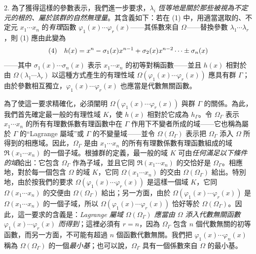 \documentclass[11pt]{article}
\providecommand{\glqq}{“}
\providecommand{\grqq}{”}
\begin{document}
2. 為了獲得這樣的參數表示，我們進一步要求，$\lambda_i$ \emph{恆等地是關於那些被視為不定元的根的、屬於該群的自然無理量}。其含義如下：若在 (1) 中，用適當選取的、不定元 $x_1\cdots x_n$ 的\emph{有理}函數 $\varphi_1(x)\cdots\varphi_r(x)$——其係數來自 $\Omega$——替換參數 $\lambda_1\cdots\lambda_r$，則 (1) 應由此變為
\[
\begin{array}{@{}l@{\quad}l@{}}
(4)& \displaystyle h(x)=x^n-\sigma_1(x)x^{n-1}+\sigma_2(x)x^{n-2}\cdots\pm\sigma_n(x)
\end{array}
\]
——其中 $\sigma_1(x)\cdots\sigma_n(x)$ 表示 $x_1\cdots x_n$ 的初等對稱函數——並且 $h(x)$ 相對於由 $\Omega(\lambda_1\cdots\lambda_r)$ 以這種方式產生的有理性域 $\Omega(\varphi_1(x)\cdots\varphi_r(x))$ 應具有群 $\Gamma$；由於參數相互獨立，$\varphi_1(x)\cdots\varphi_r(x)$ 也應當是代數無關函數。

為了使這一要求精確化，必須闡明 $\Omega(\varphi_1(x)\cdots\varphi_r(x))$ 與群 $\Gamma$ 的關係。為此，我們首先確定最一般的有理性域 $K$，使 $h(x)$ 相對於它成為 $h_\Gamma$。令 $\Omega_\Gamma$ 表示 $x_1\cdots x_n$ 的所有有理數係數有理函數中在 $\Gamma$ 作用下不變者所成的域——它也稱為屬於 $\Gamma$ 的\glqq{}Lagrange 屬域\grqq{}或 $\Gamma$ 的不變量域——並令 $\Omega(\Omega_\Gamma)$ 表示把 $\Omega_\Gamma$ 添入 $\Omega$ 所得到的相應域。因此，$\Omega_\Gamma$ 是由 $x_1\cdots x_n$ 的所有有理數係數有理函數組成的域 $\mathfrak R(x_1\cdots x_n)$ 的一個子域。根據群的定義，最一般的域 $K$ 可由\emph{任何滿足以下條件的域}給出：它包含 $\Omega_\Gamma$ 作為子域，並且它同 $\mathfrak R(x_1\cdots x_n)$ 的交恰好是 $\Omega_\Gamma$。相應地，對於每一個包含 $\Omega$ 的域 $K$，它同 $\Omega(x_1\cdots x_n)$ 的交由 $\Omega(\Omega_\Gamma)$ 給出。特別地，由於按我們的要求 $\Omega(\varphi_1(x)\cdots\varphi_r(x))$ 是這樣一個域 $K$，它同 $\Omega(x_1\cdots x_n)$ 的交便由 $\Omega(\Omega_\Gamma)$ 給出；另一方面，由於 $\Omega(\varphi_1(x)\cdots\varphi_r(x))$ 是 $\Omega(x_1\cdots x_n)$ 的一個子域，所以 $\Omega(\varphi_1(x)\cdots\varphi_r(x))$ 恰好等於 $\Omega(\Omega_\Gamma)$。因此，這一要求的含義是：\emph{Lagrange 屬域 $\Omega(\Omega_\Gamma)$ 應當由 $\Omega$ 添入代數無關函數 $\varphi_1(x)\cdots\varphi_r(x)$ 而得到}；這裡必須有 $r=n$，因為 $\Omega_\Gamma$ 包含 $n$ 個代數無關的初等函數，而另一方面，不可能有超過 $n$ 個函數代數無關。我們把 $\varphi_1(x)\cdots\varphi_n(x)$ 稱為 $\Omega(\Omega_\Gamma)$ 的一個\emph{最小基}；也可以說，$\Omega_\Gamma$ 具有一個係數來自 $\Omega$ 的最小基。
\end{document}
